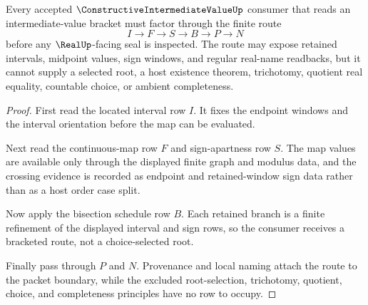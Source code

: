 \begin{theorem}
\label{thm:constructive-intermediate-value-bisection-route}
Every accepted $\ConstructiveIntermediateValueUp$ consumer that reads an intermediate-value bracket must factor through the finite route
$$
I \longrightarrow F \longrightarrow S \longrightarrow B \longrightarrow P \longrightarrow N
$$
before any $\RealUp$-facing seal is inspected. The route may expose retained intervals, midpoint values, sign windows, and regular real-name readbacks, but it cannot supply a selected root, a host existence theorem, trichotomy, quotient real equality, countable choice, or ambient completeness.
\end{theorem}
\begin{proof}
First read the located interval row $I$. It fixes the endpoint windows and the interval orientation before the map can be evaluated.

Next read the continuous-map row $F$ and sign-apartness row $S$. The map values are available only through the displayed finite graph and modulus data, and the crossing evidence is recorded as endpoint and retained-window sign data rather than as a host order case split.

Now apply the bisection schedule row $B$. Each retained branch is a finite refinement of the displayed interval and sign rows, so the consumer receives a bracketed route, not a choice-selected root.

Finally pass through $P$ and $N$. Provenance and local naming attach the route to the packet boundary, while the excluded root-selection, trichotomy, quotient, choice, and completeness principles have no row to occupy.
\end{proof}

